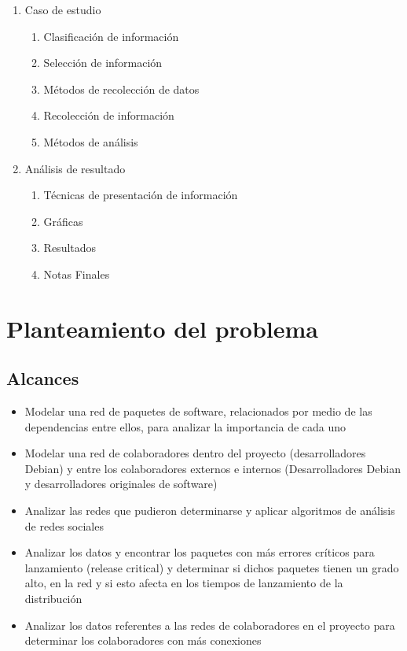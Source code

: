 \documentclass[letterpaper,12pt,titlepage]{report}
\begin{document}
\begin{enumerate}
\item Caso de estudio
  \begin{enumerate}
  \item Clasificación de información
  \item Selección de información
  \item Métodos de recolección de datos
  \item Recolección de información
  \item Métodos de análisis
  \end{enumerate}
\item Análisis de resultado
  \begin{enumerate}
  \item Técnicas de presentación de información
  \item Gráficas
  \item Resultados
  \item Notas Finales
  \end{enumerate}
\end{enumerate}

\chapter{Planteamiento del problema}
\section*{Alcances}
\begin{itemize}
\item Modelar una red de paquetes de software, relacionados por medio de las dependencias entre ellos, para analizar la importancia de cada uno
\item Modelar una red de colaboradores dentro del proyecto
  (desarrolladores Debian) y entre los colaboradores externos e
  internos (Desarrolladores Debian y desarrolladores originales de
  software)
\item Analizar las redes que pudieron determinarse y aplicar
  algoritmos de análisis de redes sociales
\item Analizar los datos y encontrar los paquetes con más errores
  críticos para lanzamiento (release critical) y determinar si dichos
  paquetes tienen un grado alto, en la red y si esto afecta en los
  tiempos de lanzamiento de la distribución
\item Analizar los datos referentes a las redes de colaboradores en el
  proyecto para determinar los colaboradores con más conexiones
\end{itemize}
\end{document}
